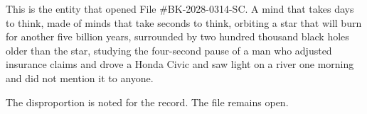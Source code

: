 \bigskip

This is the entity that opened File \#BK-2028-0314-SC. A mind that takes days to think, made of minds that take seconds to think, orbiting a star that will burn for another five billion years, surrounded by two hundred thousand black holes older than the star, studying the four-second pause of a man who adjusted insurance claims and drove a Honda Civic and saw light on a river one morning and did not mention it to anyone.

The disproportion is noted for the record. The file remains open.
